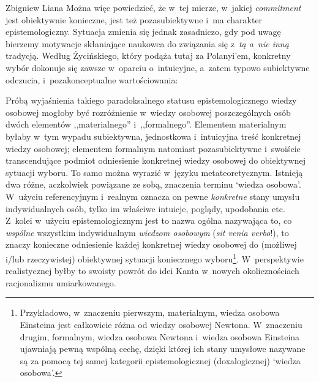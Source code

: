 \begin{artplenv}{Zbigniew Liana}
Można więc powiedzieć, że w~tej mierze, w~jakiej \textit{commitment} jest obiektywnie konieczne, jest też pozasubiektywne i~ma charakter epistemologiczny. Sytuacja zmienia się jednak zasadniczo, gdy pod uwagę bierzemy motywacje skłaniające naukowca do związania się z~\textit{tą a~nie inną} tradycją. Według Życińskiego, który podąża tutaj za Polanyi'em, konkretny wybór dokonuje się zawsze w~oparciu o~intuicyjne, a~zatem typowo subiektywne odczucia, i~pozakonceptualne wartościowania:


Próbą wyjaśnienia takiego paradoksalnego statusu epistemologicznego wiedzy osobowej mogłoby być rozróżnienie w~wiedzy osobowej poszczególnych osób dwóch elementów ,,materialnego'' i~,,formalnego''. Elementem materialnym byłaby w~tym wypadu subiektywna, jednostkowa i~intuicyjna treść konkretnej wiedzy osobowej; elementem formalnym natomiast pozasubiektywne i~swoiście transcendujące podmiot odniesienie konkretnej wiedzy osobowej do obiektywnej sytuacji wyboru. To samo można wyrazić w~języku metateoretycznym. Istnieją dwa różne, aczkolwiek powiązane ze sobą, znaczenia terminu ‘wiedza osobowa'. W~użyciu referencyjnym i~realnym oznacza on pewne \textit{konkretne} stany umysłu indywidualnych osób, tylko im właściwe intuicje, poglądy, upodobania etc. Z~kolei w~użyciu epistemologicznym jest to nazwa ogólna nazywająca to, co \textit{wspólne} wszystkim indywidualnym \textit{wiedzom osobowym} (\textit{sit venia verbo}!), to znaczy konieczne odniesienie każdej konkretnej wiedzy osobowej do (możliwej i/lub rzeczywistej) obiektywnej sytuacji koniecznego wyboru\footnote{Przykładowo, w~znaczeniu pierwszym, materialnym, wiedza osobowa Einsteina jest całkowicie różna od wiedzy osobowej Newtona. W~znaczeniu drugim, formalnym, wiedza osobowa Newtona i~wiedza osobowa Einsteina ujawniają pewną wspólną cechę, dzięki której ich stany umysłowe nazywane są za pomocą tej samej kategorii epistemologicznej (doxalogicznej) ‘wiedza osobowa'.}. W~perspektywie realistycznej byłby to swoisty powrót do idei Kanta w~nowych okolicznościach racjonalizmu umiarkowanego.


\end{artplenv}
